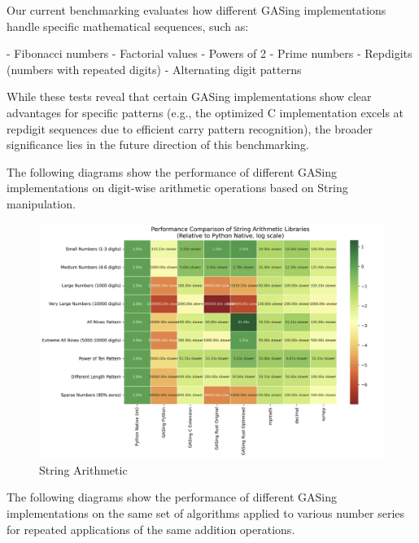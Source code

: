 Our current benchmarking evaluates how different GASing implementations handle specific mathematical sequences, such as:

- Fibonacci numbers
- Factorial values
- Powers of 2
- Prime numbers
- Repdigits (numbers with repeated digits)
- Alternating digit patterns

While these tests reveal that certain GASing implementations show clear advantages for specific patterns (e.g., the optimized C implementation excels at repdigit sequences due to efficient carry pattern recognition), the broader significance lies in the future direction of this benchmarking.

The following diagrams show the performance of different GASing implementations on digit-wise arithmetic operations based on String manipulation.

\begin{figure}[H]
  \centering
  \includegraphics[width=\linewidth]{images/StringArithmetic.png}
  \caption{String Arithmetic}
  \label{fig:stringarithmetic}
\end{figure}



The following diagrams show the performance of different GASing implementations on the same set of algorithms applied to various number series for repeated applications of the same addition operations.

